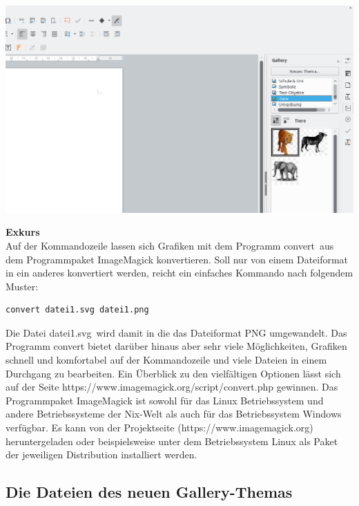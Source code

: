 \documentclass[a4paper,10pt,pagesize,titlepage]{scrbook}
\begin{document}
\begin{center}
	\captionsetup{type=figure}
	\includegraphics[width=0.9\linewidth]{pics/libreoffice_gallery_new_theme_with_graphics}
	\label{fig:libreoffice_gallery_new_theme_with_graphics}
\end{center}


\bigskip\textbf{Exkurs}
\\

Auf der Kommandozeile lassen sich Grafiken mit dem Programm \glqq convert\grqq~aus dem Programmpaket ImageMagick konvertieren. Soll nur von einem Dateiformat in ein anderes konvertiert werden, reicht ein einfaches Kommando nach folgendem Muster:
\begin{lstlisting}
convert datei1.svg datei1.png
\end{lstlisting}

Die Datei \glqq datei1.svg\grqq~wird damit in die das Dateiformat PNG umgewandelt. Das Programm convert bietet darüber hinaus aber sehr viele Möglichkeiten, Grafiken schnell und komfortabel auf der Kommandozeile und viele Dateien in einem Durchgang zu bearbeiten.
Ein Überblick zu den vielfältigen Optionen lässt sich auf der Seite https://www.imagemagick.org/script/convert.php gewinnen. Das Programmpaket ImageMagick ist sowohl für das Linux Betriebssystem und andere Betriebssysteme der Nix-Welt als auch für das Betriebssystem Windows verfügbar. Es kann von der Projektseite (https://www.imagemagick.org) heruntergeladen oder beispielsweise unter dem Betriebssystem Linux als Paket der jeweiligen Distribution installiert werden.

\subsection{Die Dateien des neuen Gallery-Themas}
\end{document}
